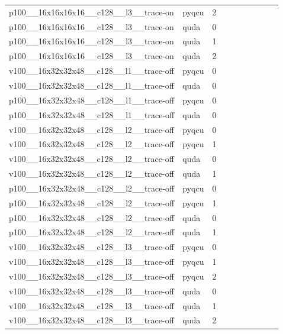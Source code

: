 \begin{table}[htbp]
\begin{tabular}{@{}llrrrrrrrr@{}}
p100\_\_16x16x16x16\_\_c128\_\_l3\_\_trace-on & pyqcu & 2 &  &  &  &  &  &  &  \\
p100\_\_16x16x16x16\_\_c128\_\_l3\_\_trace-on & quda & 0 &  &  &  &  &  &  &  \\
p100\_\_16x16x16x16\_\_c128\_\_l3\_\_trace-on & quda & 1 &  &  &  &  &  &  &  \\
p100\_\_16x16x16x16\_\_c128\_\_l3\_\_trace-on & quda & 2 &  &  &  &  &  &  &  \\
v100\_\_16x32x32x48\_\_c128\_\_l1\_\_trace-off & pyqcu & 0 &  &  &  &  &  &  &  \\
v100\_\_16x32x32x48\_\_c128\_\_l1\_\_trace-off & quda & 0 &  &  &  &  &  &  &  \\
p100\_\_16x32x32x48\_\_c128\_\_l1\_\_trace-off & pyqcu & 0 &  &  &  &  &  &  &  \\
p100\_\_16x32x32x48\_\_c128\_\_l1\_\_trace-off & quda & 0 &  &  &  &  &  &  &  \\
v100\_\_16x32x32x48\_\_c128\_\_l2\_\_trace-off & pyqcu & 0 &  &  &  &  &  &  &  \\
v100\_\_16x32x32x48\_\_c128\_\_l2\_\_trace-off & pyqcu & 1 &  &  &  &  &  &  &  \\
v100\_\_16x32x32x48\_\_c128\_\_l2\_\_trace-off & quda & 0 &  &  &  &  &  &  &  \\
v100\_\_16x32x32x48\_\_c128\_\_l2\_\_trace-off & quda & 1 &  &  &  &  &  &  &  \\
p100\_\_16x32x32x48\_\_c128\_\_l2\_\_trace-off & pyqcu & 0 &  &  &  &  &  &  &  \\
p100\_\_16x32x32x48\_\_c128\_\_l2\_\_trace-off & pyqcu & 1 &  &  &  &  &  &  &  \\
p100\_\_16x32x32x48\_\_c128\_\_l2\_\_trace-off & quda & 0 &  &  &  &  &  &  &  \\
p100\_\_16x32x32x48\_\_c128\_\_l2\_\_trace-off & quda & 1 &  &  &  &  &  &  &  \\
v100\_\_16x32x32x48\_\_c128\_\_l3\_\_trace-off & pyqcu & 0 &  &  &  &  &  &  &  \\
v100\_\_16x32x32x48\_\_c128\_\_l3\_\_trace-off & pyqcu & 1 &  &  &  &  &  &  &  \\
v100\_\_16x32x32x48\_\_c128\_\_l3\_\_trace-off & pyqcu & 2 &  &  &  &  &  &  &  \\
v100\_\_16x32x32x48\_\_c128\_\_l3\_\_trace-off & quda & 0 &  &  &  &  &  &  &  \\
v100\_\_16x32x32x48\_\_c128\_\_l3\_\_trace-off & quda & 1 &  &  &  &  &  &  &  \\
v100\_\_16x32x32x48\_\_c128\_\_l3\_\_trace-off & quda & 2 &  &  &  &  &  &  &  \\

\end{tabular}
\end{table}
